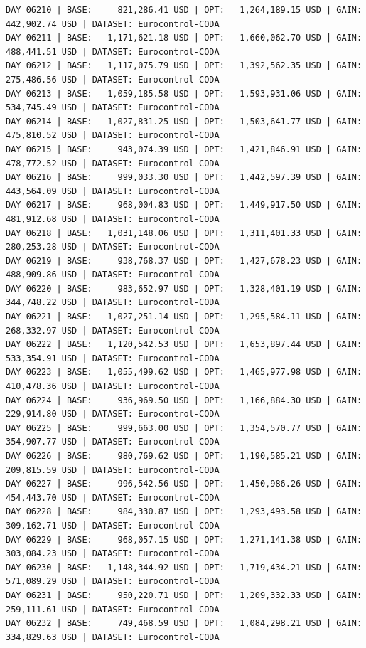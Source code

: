 \documentclass[11pt,a4paper]{article}
\begin{document}
\begin{verbatim}
DAY 06210 | BASE:     821,286.41 USD | OPT:   1,264,189.15 USD | GAIN: 442,902.74 USD | DATASET: Eurocontrol-CODA
DAY 06211 | BASE:   1,171,621.18 USD | OPT:   1,660,062.70 USD | GAIN: 488,441.51 USD | DATASET: Eurocontrol-CODA
DAY 06212 | BASE:   1,117,075.79 USD | OPT:   1,392,562.35 USD | GAIN: 275,486.56 USD | DATASET: Eurocontrol-CODA
DAY 06213 | BASE:   1,059,185.58 USD | OPT:   1,593,931.06 USD | GAIN: 534,745.49 USD | DATASET: Eurocontrol-CODA
DAY 06214 | BASE:   1,027,831.25 USD | OPT:   1,503,641.77 USD | GAIN: 475,810.52 USD | DATASET: Eurocontrol-CODA
DAY 06215 | BASE:     943,074.39 USD | OPT:   1,421,846.91 USD | GAIN: 478,772.52 USD | DATASET: Eurocontrol-CODA
DAY 06216 | BASE:     999,033.30 USD | OPT:   1,442,597.39 USD | GAIN: 443,564.09 USD | DATASET: Eurocontrol-CODA
DAY 06217 | BASE:     968,004.83 USD | OPT:   1,449,917.50 USD | GAIN: 481,912.68 USD | DATASET: Eurocontrol-CODA
DAY 06218 | BASE:   1,031,148.06 USD | OPT:   1,311,401.33 USD | GAIN: 280,253.28 USD | DATASET: Eurocontrol-CODA
DAY 06219 | BASE:     938,768.37 USD | OPT:   1,427,678.23 USD | GAIN: 488,909.86 USD | DATASET: Eurocontrol-CODA
DAY 06220 | BASE:     983,652.97 USD | OPT:   1,328,401.19 USD | GAIN: 344,748.22 USD | DATASET: Eurocontrol-CODA
DAY 06221 | BASE:   1,027,251.14 USD | OPT:   1,295,584.11 USD | GAIN: 268,332.97 USD | DATASET: Eurocontrol-CODA
DAY 06222 | BASE:   1,120,542.53 USD | OPT:   1,653,897.44 USD | GAIN: 533,354.91 USD | DATASET: Eurocontrol-CODA
DAY 06223 | BASE:   1,055,499.62 USD | OPT:   1,465,977.98 USD | GAIN: 410,478.36 USD | DATASET: Eurocontrol-CODA
DAY 06224 | BASE:     936,969.50 USD | OPT:   1,166,884.30 USD | GAIN: 229,914.80 USD | DATASET: Eurocontrol-CODA
DAY 06225 | BASE:     999,663.00 USD | OPT:   1,354,570.77 USD | GAIN: 354,907.77 USD | DATASET: Eurocontrol-CODA
DAY 06226 | BASE:     980,769.62 USD | OPT:   1,190,585.21 USD | GAIN: 209,815.59 USD | DATASET: Eurocontrol-CODA
DAY 06227 | BASE:     996,542.56 USD | OPT:   1,450,986.26 USD | GAIN: 454,443.70 USD | DATASET: Eurocontrol-CODA
DAY 06228 | BASE:     984,330.87 USD | OPT:   1,293,493.58 USD | GAIN: 309,162.71 USD | DATASET: Eurocontrol-CODA
DAY 06229 | BASE:     968,057.15 USD | OPT:   1,271,141.38 USD | GAIN: 303,084.23 USD | DATASET: Eurocontrol-CODA
DAY 06230 | BASE:   1,148,344.92 USD | OPT:   1,719,434.21 USD | GAIN: 571,089.29 USD | DATASET: Eurocontrol-CODA
DAY 06231 | BASE:     950,220.71 USD | OPT:   1,209,332.33 USD | GAIN: 259,111.61 USD | DATASET: Eurocontrol-CODA
DAY 06232 | BASE:     749,468.59 USD | OPT:   1,084,298.21 USD | GAIN: 334,829.63 USD | DATASET: Eurocontrol-CODA

\end{verbatim}
\end{document}

